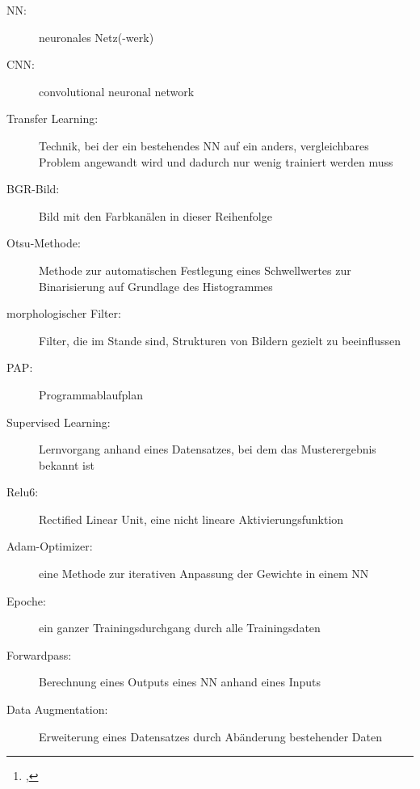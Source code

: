 \documentclass[12pt,toc=bib,toc=listof]{scrreprt}
\title{\reprttopic}
\author{\reprtstudentname\footnote{\reprtstudentid, \reprtstudentmail}}
\begin{document}
\renewcommand*{\figurename}{Abb.}
\maketitle
{}

\tableofcontents

\label{sec:abkuerzungsverzeichnis}
\noindent
\begin{description}

  \item[NN:]  neuronales Netz(-werk)
  \item[CNN:]  convolutional neuronal network
  \item[Transfer Learning:]  Technik, bei der ein bestehendes NN auf ein anders, vergleichbares Problem angewandt wird und dadurch nur wenig trainiert werden muss  
  \item[BGR-Bild:]  Bild mit den Farbkanälen in dieser Reihenfolge
  \item[Otsu-Methode:]  Methode zur automatischen Festlegung eines Schwellwertes zur Binarisierung auf Grundlage des Histogrammes
  \item[morphologischer Filter:]  Filter, die im Stande sind, Strukturen von Bildern gezielt zu beeinflussen \cite{digi_bv}
  \item[PAP: ]  Programmablaufplan
  \item[Supervised Learning: ] Lernvorgang anhand eines Datensatzes, bei dem das Musterergebnis bekannt ist
  \item[Relu6: ]  Rectified Linear Unit, eine nicht lineare Aktivierungsfunktion 
  \item[Adam-Optimizer:]  eine Methode zur iterativen Anpassung der Gewichte in einem NN
  \item[Epoche:]  ein ganzer Trainingsdurchgang durch alle Trainingsdaten 
  \item[Forwardpass:]  Berechnung eines Outputs eines NN anhand eines Inputs
  \item[Data Augmentation:]  Erweiterung eines Datensatzes durch Abänderung bestehender Daten
   
\end{description}


\onehalfspacing


\newpage
{}
\end{document}
